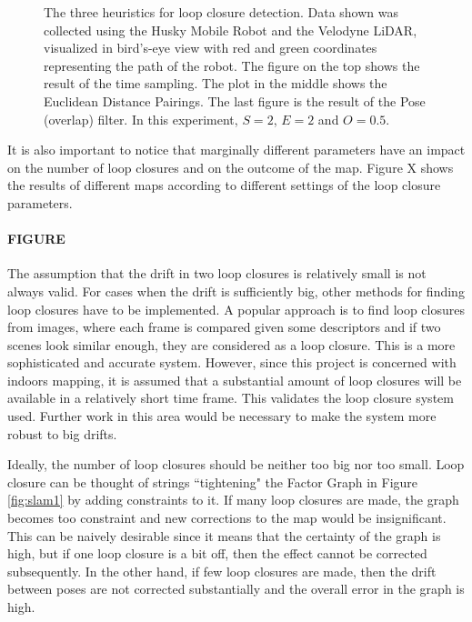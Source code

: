 \documentclass[12pt]{article}
\begin{document}
\begin{figure}
\begin{minipage}{0.67\textwidth}
\end{minipage}\hfill
\begin{minipage}{0.33\textwidth}
\centering
\caption[t]{The three heuristics for loop closure detection. Data shown was collected using the Husky Mobile Robot and the Velodyne LiDAR, visualized in bird's-eye view with red and green coordinates representing the path of the robot. The figure on the top shows the result of the time sampling. The plot in the middle shows the Euclidean Distance Pairings. The last figure is the result of the Pose (overlap) filter. In this experiment, $S=2$, $E=2$ and $O=0.5$.}
\label{fig:loopClosureDetection}
\end{minipage}
\end{figure}

It is also important to notice that marginally different parameters have an impact on the number of loop closures and on the outcome of the map. Figure X shows the results of different maps according to different settings of the loop closure parameters.
		
	\paragraph{FIGURE}
	
The assumption that the drift in two loop closures is relatively small is not always valid. For cases when the drift is sufficiently big, other methods for finding loop closures have to be implemented. A popular approach is to find loop closures from images, where each frame is compared given some descriptors and if two scenes look similar enough, they are considered as a loop closure. This is a more sophisticated and accurate system. However, since this project is concerned with indoors mapping, it is assumed that a substantial amount of loop closures will be available in a relatively short time frame. This validates the loop closure system used. Further work in this area would be necessary to make the system more robust to big drifts.	
	
Ideally, the number of loop closures should be neither too big nor too small. Loop closure can be thought of strings ``tightening" the Factor Graph in Figure \ref{fig:slam1} by adding constraints to it. If many loop closures are made, the graph becomes too constraint and new corrections to the map would be insignificant. This can be naively desirable since it means that the certainty of the graph is high, but if one loop closure is a bit off, then the effect cannot be corrected subsequently. In the other hand, if few loop closures are made, then the drift between poses are not corrected substantially and the overall error in the graph is high.
	
\end{document}
